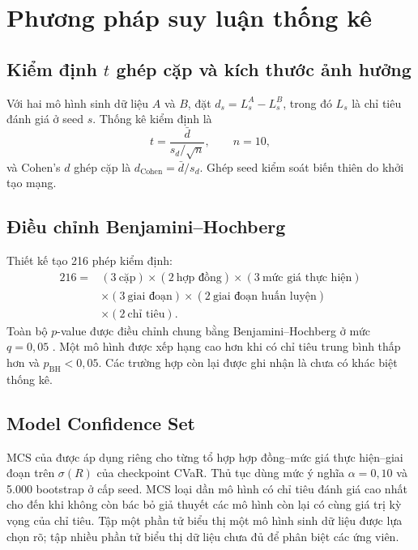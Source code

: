 \section{Phương pháp suy luận thống kê}
\label{sec:c3-statistics}

\subsection{Kiểm định $t$ ghép cặp và kích thước ảnh hưởng}

Với hai mô hình sinh dữ liệu $A$ và $B$, đặt $d_s=L_s^A-L_s^B$, trong đó
$L_s$ là chỉ tiêu đánh giá ở seed $s$. Thống kê kiểm định là
\begin{equation}
    t=\frac{\bar d}{s_d/\sqrt{n}},\qquad n=10,
    \label{eq:c3-paired-t}
\end{equation}
và Cohen's $d$ ghép cặp là $d_{\mathrm{Cohen}}=\bar d/s_d$. Ghép seed kiểm
soát biến thiên do khởi tạo mạng.

\subsection{Điều chỉnh Benjamini--Hochberg}

Thiết kế tạo 216 phép kiểm định:
\begin{equation}
\begin{aligned}
216={}&(3\ \text{cặp})\times(2\ \text{hợp đồng})
\times(3\ \text{mức giá thực hiện})\\
&\times(3\ \text{giai đoạn})
\times(2\ \text{giai đoạn huấn luyện})\\
&\times(2\ \text{chỉ tiêu}).
\end{aligned}
\end{equation}
Toàn bộ $p$-value được điều chỉnh chung bằng Benjamini--Hochberg ở mức
$q=0{,}05$ \parencite{BenjaminiHochberg1995}. Một mô hình được xếp hạng cao
hơn khi có chỉ tiêu trung bình thấp hơn và $p_{\mathrm{BH}}<0{,}05$. Các
trường hợp còn lại được ghi nhận là chưa có khác biệt thống kê.

\subsection{Model Confidence Set}

MCS của \textcite{HansenLundeNason2011} được áp dụng riêng cho từng tổ hợp
hợp đồng--mức giá thực hiện--giai đoạn trên $\sigma(R)$ của checkpoint CVaR. Thủ tục
dùng mức ý nghĩa $\alpha=0{,}10$ và 5.000 bootstrap ở cấp seed. MCS loại dần
mô hình có chỉ tiêu đánh giá cao nhất cho đến khi không còn bác bỏ giả thuyết các mô hình còn
lại có cùng giá trị kỳ vọng của chỉ tiêu. Tập một phần tử biểu thị một mô hình sinh dữ liệu được lựa chọn rõ; tập nhiều
phần tử biểu thị dữ liệu chưa đủ để phân biệt các ứng viên.

